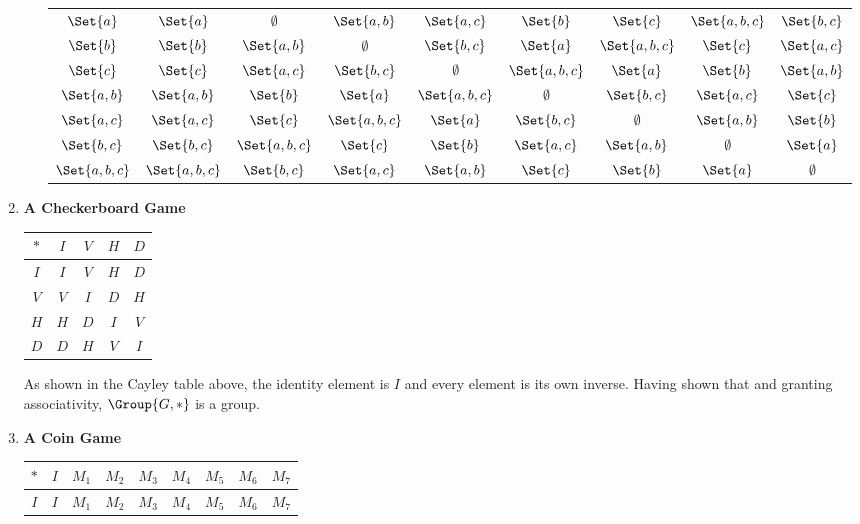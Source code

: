 \begin{enumerate}[label={\Alph*.},font={\bfseries}]
\begin{enumerate}[label={\arabic*},font={\bfseries}]
\begin{center}
\begin{tabular}{ c | c c c c c c c c}
        $\Set{a}$ & $\Set{a}$ & $\emptyset$ & $\Set{a,b}$ & $\Set{a,c}$ & $\Set{b}$ & $\Set{c}$ & $\Set{a,b,c}$ & $\Set{b,c}$ \\
        $\Set{b}$ & $\Set{b}$ & $\Set{a,b}$ & $\emptyset$ & $\Set{b,c}$ & $\Set{a}$ & $\Set{a,b,c}$ & $\Set{c}$ & $\Set{a,c}$ \\
        $\Set{c}$ & $\Set{c}$ & $\Set{a,c}$ & $\Set{b,c}$ & $\emptyset$ & $\Set{a,b,c}$ & $\Set{a}$ & $\Set{b}$ & $\Set{a,b}$ \\
        $\Set{a,b}$ & $\Set{a,b}$ & $\Set{b}$ & $\Set{a}$ & $\Set{a,b,c}$ & $\emptyset$ & $\Set{b,c}$ & $\Set{a,c}$ & $\Set{c}$ \\
        $\Set{a,c}$ & $\Set{a,c}$ & $\Set{c}$ & $\Set{a,b,c}$ & $\Set{a}$ & $\Set{b,c}$ & $\emptyset$ & $\Set{a,b}$ & $\Set{b}$ \\
        $\Set{b,c}$ & $\Set{b,c}$ & $\Set{a,b,c}$ & $\Set{c}$ & $\Set{b}$ & $\Set{a,c}$ & $\Set{a,b}$ & $\emptyset$ & $\Set{a}$ \\
        $\Set{a,b,c}$ & $\Set{a,b,c}$ & $\Set{b,c}$ & $\Set{a,c}$ & $\Set{a,b}$ & $\Set{c}$ & $\Set{b}$ & $\Set{a}$ & $\emptyset$
      \end{tabular}
    \end{center}
  \end{enumerate}
\item {\bf A Checkerboard Game}
  \begin{center}
    \begin{tabular}{ c | c c c c }
      $*$ & $I$ & $V$ & $H$ & $D$ \\
      \hline
      $I$ & $I$ & $V$ & $H$ & $D$ \\
      $V$ & $V$ & $I$ & $D$ & $H$ \\
      $H$ & $H$ & $D$ & $I$ & $V$ \\
      $D$ & $D$ & $H$ & $V$ & $I$
    \end{tabular}
  \end{center}
  As shown in the \gls{Cayley table} above, the identity element is $I$ and
  every element is its own inverse. Having shown that and granting
  associativity, $\Group{G, *}$ is a group.
\item {\bf A Coin Game}
  \begin{center}
    \begin{tabular}{ c | c c c c c c c c }
      $*$ & $I$ & $M_1$ & $M_2$ & $M_3$ & $M_4$ & $M_5$ & $M_6$ & $M_7$ \\
      \hline
      $I$ & $I$ & $M_1$ & $M_2$ & $M_3$ & $M_4$ & $M_5$ & $M_6$ & $M_7$ \\

\end{tabular}
\end{center}
\end{enumerate}
